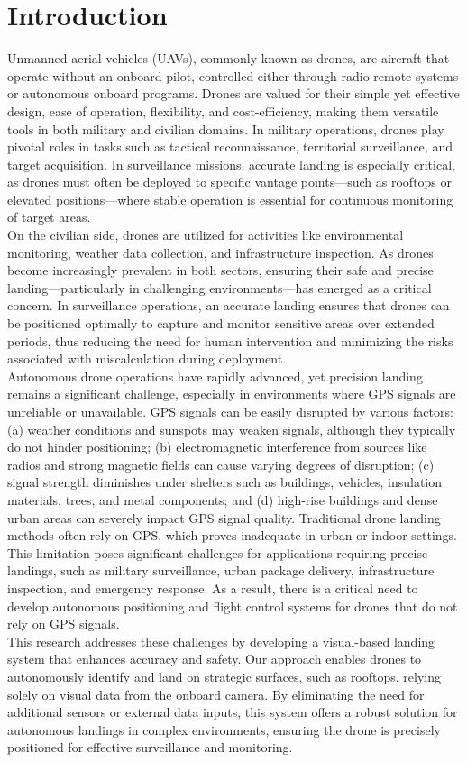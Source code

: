 \documentclass[unnumsec,webpdf,modern,large]{mam-authoring-template}%
\begin{document}
\section{Introduction}
Unmanned aerial vehicles (UAVs), commonly known as drones, are aircraft that operate without an onboard pilot, controlled either through radio remote systems or autonomous onboard programs. Drones are valued for their simple yet effective design, ease of operation, flexibility, and cost-efficiency, making them versatile tools in both military and civilian domains. In military operations, drones play pivotal roles in tasks such as tactical reconnaissance, territorial surveillance, and target acquisition. In surveillance missions, accurate landing is especially critical, as drones must often be deployed to specific vantage points—such as rooftops or elevated positions—where stable operation is essential for continuous monitoring of target areas.\\
On the civilian side, drones are utilized for activities like environmental monitoring, weather data collection, and infrastructure inspection. As drones become increasingly prevalent in both sectors, ensuring their safe and precise landing—particularly in challenging environments—has emerged as a critical concern. In surveillance operations, an accurate landing ensures that drones can be positioned optimally to capture and monitor sensitive areas over extended periods, thus reducing the need for human intervention and minimizing the risks associated with miscalculation during deployment.\\
Autonomous drone operations have rapidly advanced, yet precision landing remains a significant challenge, especially in environments where GPS signals are unreliable or unavailable. GPS signals can be easily disrupted by various factors: (a) weather conditions and sunspots may weaken signals, although they typically do not hinder positioning; (b) electromagnetic interference from sources like radios and strong magnetic fields can cause varying degrees of disruption; (c) signal strength diminishes under shelters such as buildings, vehicles, insulation materials, trees, and metal components; and (d) high-rise buildings and dense urban areas can severely impact GPS signal quality. Traditional drone landing methods often rely on GPS, which proves inadequate in urban or indoor settings. This limitation poses significant challenges for applications requiring precise landings, such as military surveillance, urban package delivery, infrastructure inspection, and emergency response. As a result, there is a critical need to develop autonomous positioning and flight control systems for drones that do not rely on GPS signals.\\
This research addresses these challenges by developing a visual-based landing system that enhances accuracy and safety. Our approach enables drones to autonomously identify and land on strategic surfaces, such as rooftops, relying solely on visual data from the onboard camera. By eliminating the need for additional sensors or external data inputs, this system offers a robust solution for autonomous landings in complex environments, ensuring the drone is precisely positioned for effective surveillance and monitoring.
\end{document}
